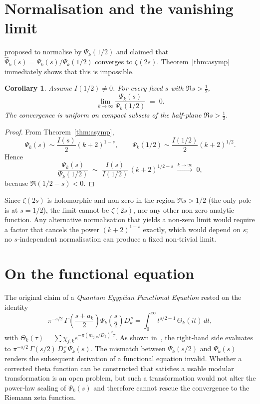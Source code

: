 \documentclass[11pt,a4paper]{article}
\newtheorem{corollary}[theorem]{Corollary}
\theoremstyle{definition}
\theoremstyle{remark}
\begin{document}
\section{Normalisation and the vanishing limit}

\cite{preprint} proposed to normalise by $\Psi_k(1/2)$ and claimed that
$\widehat\Psi_k(s)=\Psi_k(s)/\Psi_k(1/2)$ converges to $\zeta(2s)$.
Theorem~\ref{thm:asymp} immediately shows that this is impossible.

\begin{corollary}\label{cor:limit}
Assume $I(1/2)\neq0$.  For every fixed $s$ with $\Re s>\frac12$,
\[
\lim_{k\to\infty} \frac{\Psi_k(s)}{\Psi_k(1/2)} \;=\; 0 .
\]
The convergence is uniform on compact subsets of the half‑plane $\Re s>\frac12$.
\end{corollary}

\begin{proof}
From Theorem~\ref{thm:asymp},
\[
\Psi_k(s) \sim \frac{I(s)}{2} (k+2)^{1-s},\qquad
\Psi_k(1/2) \sim \frac{I(1/2)}{2} (k+2)^{1/2}.
\]
Hence
\[
\frac{\Psi_k(s)}{\Psi_k(1/2)} \;\sim\; \frac{I(s)}{I(1/2)}\, (k+2)^{1/2-s}
\;\xrightarrow{k\to\infty}\; 0,
\]
because $\Re(1/2-s)<0$.
\end{proof}

Since $\zeta(2s)$ is holomorphic and non‑zero in the region $\Re s>1/2$ (the only pole is at $s=1/2$),
the limit cannot be $\zeta(2s)$, nor any other non‑zero analytic function.
Any alternative normalisation that yields a non‑zero limit would require a factor that cancels the
power $(k+2)^{1-s}$ exactly, which would depend on $s$; no $s$‑independent normalisation can
produce a fixed non‑trivial limit.

\section{On the functional equation}

The original claim of a \emph{Quantum Egyptian Functional Equation} rested on the identity
\[
\pi^{-s/2}\,\Gamma\!\left(\frac{s+a_k}{2}\right)\Psi_k\!\left(\frac{s}{2}\right)D_k^{\,s}
= \int_0^{\infty} t^{s/2-1}\,\Theta_k(it)\,dt,
\]
with $\Theta_k(\tau)=\sum\chi_{j,k}e^{-\pi(m_{j,k}/D_k)^2\tau}$.
As shown in~\cite{correction}, the right‑hand side evaluates to
$\pi^{-s/2}\,\Gamma(s/2)\,D_k^{\,s}\,\Psi_k(s)$.
The mismatch between $\Psi_k(s/2)$ and $\Psi_k(s)$ renders the subsequent derivation of a
functional equation invalid.  Whether a corrected theta function can be constructed that
satisfies a usable modular transformation is an open problem, but such a transformation
would not alter the power‑law scaling of $\Psi_k(s)$ and therefore cannot rescue the
convergence to the Riemann zeta function.
\end{document}

